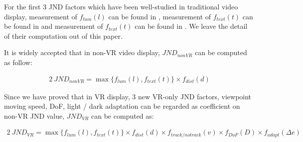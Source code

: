 For the first 3 JND factors which have been well-studied in traditional video display, measurement of $f_{lum}(l)$ can be found in \cite{luminance1}, measurement of $f_{text}(t)$ can be found in \cite{PSPNR} and measurement of $f_{text}(t)$ can be found in \cite{distance}. We leave the detail of their computation out of this paper.

It is widely accepted \cite{PSPNR} that in non-VR video display, $JND_{nonVR}$ can be computed as follow:

\begin{alignat}{2}\
JND_{nonVR} = \max \{ f_{lum}(l) , f_{text}(t)\} \times f_{dist}(d)
\end{alignat}

Since we have proved that in VR display, 3 new VR-only JND factors, viewpoint moving speed, DoF, light / dark adaptation can be regarded as coefficient on non-VR JND value, $JND_{VR}$ can be computed as:

\begin{alignat}{2}\
JND_{VR} = \max \{ f_{lum}(l) , f_{text}(t)\} \times f_{dist}(d) \times f_{track/notrack}(v) \times f_{DoF}(D) \times f_{adapt}(\Delta e)
\end{alignat}
